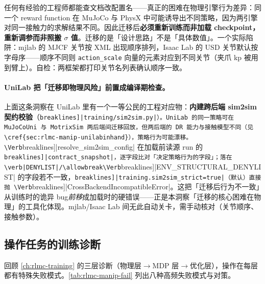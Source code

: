 \begin{insight}\label{ins:rlmc-manip-bridge}
任何有经验的工程师都能查文档改配置名——真正的困难在物理引擎行为差异：同一个 reward function 在 MuJoCo 与 PhysX 中可能诱导出不同策略，因为两引擎对同一接触力的求解结果不同。因此迁移后\textbf{必须重新训练而非加载 checkpoint，重新调参而非照搬 $\sigma$ 值}。迁移的是「设计思路」不是「具体数值」。一个实际陷阱：mjlab 的 MJCF 关节按 XML 出现顺序排列，Isaac Lab 的 USD 关节默认按字母序——顺序不同则 \verb|action_scale| 向量的元素对应到不同关节（夹爪 kp 被用到臂上）。自检：两框架都打印关节名列表确认顺序一致。
\end{insight}

\paragraph{UniLab 把「迁移即物理风险」前置成编译期检查。}上面这条洞察在 UniLab 里有一个一等公民的工程对应物：\textbf{内建跨后端 sim2sim 契约校验}（\Verb[breaklines]|training/sim2sim.py|）。UniLab 的同一策略可在 MuJoCoUni 与 MotrixSim 两后端间迁移回放，但两后端的 DR 能力与接触模型不同（见 \cref{sec:rlmc-manip-unilabinhand}），策略行为可能漂移。\Verb[breaklines]|resolve_sim2sim_config| 在加载前读源 run 的 \Verb[breaklines]|contract_snapshot|，逐字段比对「决定策略行为的字段」；落在 \verb|DENYLIST|/\allowbreak\Verb[breaklines]|ENV_STRUCTURAL_DENYLIST| 的字段若不一致，\Verb[breaklines]|training.sim2sim_strict=true|（默认）直接抛 \Verb[breaklines]|CrossBackendIncompatibleError|。这把「迁移后行为不一致」从训练时的诡异 bug\emph{前移}成加载时的硬错误——正是本洞察「迁移的核心困难在物理」的工具化体现。mjlab/Isaac Lab 间无此自动关卡，需手动核对（关节顺序、接触参数）。

\subsection{操作任务的训练诊断}
\label{sec:rlmc-manip-diag}

回顾 \cref{ch:rlmc-training} 的三层诊断（物理层$\to$MDP 层$\to$优化层），操作在每层都有特殊失败模式。\cref{tab:rlmc-manip-fail} 列出八种高频失败模式与对策。

